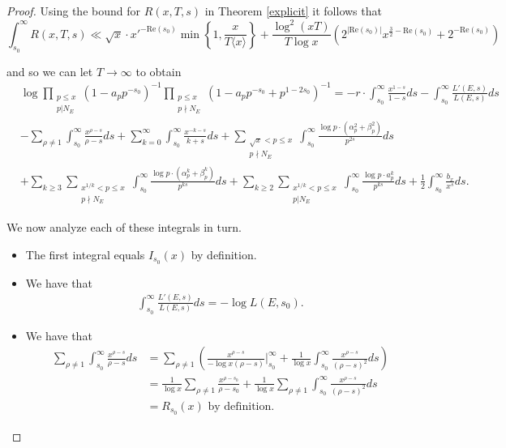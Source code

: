\documentclass[12pt,reqno]{amsart}
\theoremstyle{definition}
\numberwithin{equation}{section}
\renewcommand{\Re}{\mathrm{Re}}
\begin{document}
\begin{proof}
Using the bound for $R(x, T, s)$ in Theorem \ref{explicit} it follows that
\begin{equation*}
\int_{s_0}^{\infty} R(x, T, s) \ll \sqrt x \cdot x'^{-\Re(s_0)} \min \left \{ 1 , \frac{x}{T \langle x \rangle } \right \} + \frac{ \log^2(xT) }{T \log x} \left(  2^{|\Re(s_0)| } x^{\frac{3}{2}-\Re(s_0)} +  2^{-\Re(s_0) }\right)
\end{equation*}

and so we can let $T \to \infty$ to obtain
\begin{align} \label{logeulerproduct} 
& \log \prod_ {\substack{p \leq x \\ p | N_E}}(1-a_pp^{-s_0})^{-1} \prod_ {\substack{p \leq x \\ p \nmid N_E}}  (1-a_pp^{-s_0}+p^{1-2s_0})^{-1}  =  -r\cdot \int_{s_0}^{\infty}\frac{x^{1-s}}{1-s} ds-\int_{s_0}^{\infty}\frac{L'(E, s)}{L(E, s)}ds 
 \nonumber \\
&-\sum_{\rho \neq 1} \int_{s_0}^{\infty} \frac{x^{\rho-s}}{\rho-s}ds   + \sum_{k=0}^{\infty}
\int_{s_0}^{\infty}\frac{x^{-k-s}}{k+s}ds +
 \sum_{\substack{\sqrt x < p \leq x \\ p \nmid  N_E}} \int_{s_0}^{\infty} \frac{\log p \cdot (\alpha_p^2+\beta_p^2)}{p^{2s}}ds \nonumber \\ 
&+ \sum_{k \geq 3} \sum_{\substack{x^{1/k} < p \leq x \\ p \nmid  N_E}} \int_{s_0}^{\infty} \frac{\log p \cdot (\alpha_p^k+\beta_p^k)}{p^{ks}}ds 
+ \sum_{k \geq 2} \sum_{\substack{x^{1/k} < p \leq x \\ p | N_E}} \int_{s_0}^{\infty} \frac{\log p \cdot a_p^k }{p^{ks}}ds+ \frac{1}{2} \int_{s_0}^{\infty} \frac{b_x}{x^s} ds. 
\end{align} 

We now analyze each of these integrals in turn. 


\begin{itemize}

\item The first integral equals $I_{s_0}(x)$ by definition. 


\item We have that 
\begin{align*}
\int_{s_0}^{\infty} \frac{L'(E, s)}{L(E, s)} ds= -\log L(E, s_0). 
\end{align*}

\item We have that 
\begin{align*}
\sum_{\rho \neq 1} \int_{s_0}^{\infty} \frac{x^{\rho-s}}{\rho-s}ds &= \sum_{\rho \neq 1} \left(  \frac{x^{\rho-s}}{- \log x (\rho-s) } \Biggr|_{s_0}^{\infty}+ \frac{1}{\log x} \int_{s_0}^{\infty} \frac{x^{\rho-s}}{(\rho-s)^2}ds \right )  \\
&= \frac{1}{\log x} \sum_{\rho \neq 1} \frac{x^{\rho-s_0}}{\rho-s_0}+ \frac{1}{\log x} \sum_{\rho \neq 1} \int_{s_0}^{\infty} \frac{x^{\rho-s}}{(\rho-s)^2}ds  \\
&= R_{s_0}(x) \textrm{ by definition. }
\end{align*}




\end{itemize}
\end{proof}
\end{document}
